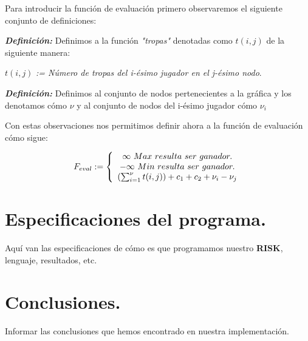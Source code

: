 \documentclass[12pt,twocolumn,draft]{article}
\begin{document}
Para introducir la funci\'on de evaluaci\'on primero observaremos el siguiente conjunto de definiciones:

\textbf{\textit{Definici\'on:}}
Definimos a la funci\'on  \textit{"tropas"} denotadas como 
$t(i,j)$ de la siguiente manera: 
\begin{center}
$t(i,j)$ \textit{:= N\'umero de tropas del i-\'esimo  jugador en el j-\'esimo nodo}.
\end{center}

\textbf{\textit{Definici\'on:}}
Definimos al conjunto de nodos pertenecientes a la gr\'afica y los denotamos c\'omo $\nu$ y al conjunto de nodos del i-\'esimo jugador c\'omo $\nu_{i}$

Con estas observaciones nos permitimos definir ahora a la funci\'on de evaluaci\'on c\'omo sigue:

$$ 
F_{eval}:= \left\{\begin{array}{c l}
  \infty \ Max\ resulta\ ser\ ganador.\\
  -\infty \ Min\ resulta\ ser\ ganador.\\
  (\sum_{i=1}^{\nu} t(i,j))+c_{1}+c_{2}+\nu_{i}-\nu_{j}
\end{array}
\right.
$$

\section{Especificaciones del programa.}
Aqu\'i van las especificaciones de c\'omo es que programamos nuestro \textbf{RISK}, lenguaje, resultados, etc.

\section{Conclusiones.}
Informar las conclusiones que hemos encontrado en nuestra implementaci\'on. \cite{2personGT}


\newpage
	
{}
\end{document}
